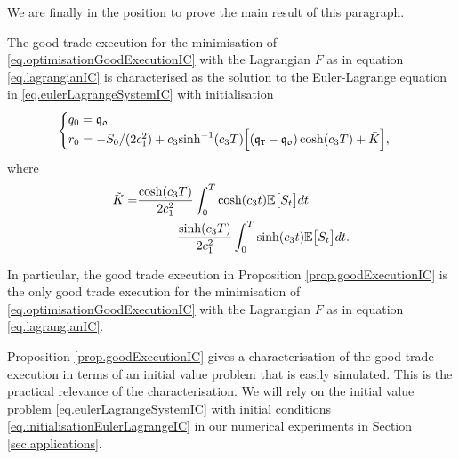 \documentclass[10pt,a4paper]{article}
\begin{document}
We are finally in the position to prove the main result of this  paragraph. 
\begin{prop} \label{prop.eulerLagrangeCharacterisationIC}
The good trade execution for the minimisation of \eqref{eq.optimisationGoodExecutionIC} with the Lagrangian $F$ as in equation \eqref{eq.lagrangianIC} is characterised as the solution to the Euler-Lagrange equation in \eqref{eq.eulerLagrangeSystemIC} with initialisation
\begin{equation}\label{eq.initialisationEulerLagrangeIC}
\begin{cases}
q_0 = \mathfrak{q_0} \\
r_0 = - S_0 / (2c_{1}^{2}) + {c_{3}}{\sinh^{-1} (c_{3} T)}
			\Big[
				(\mathfrak{q}_{\mathtt{T} } - \mathfrak{q_0}) \cosh(c_{3}T) 
				+\tilde{K}
				\Big],
\end{cases}
\end{equation}
where 
\begin{equation*}
\begin{split}
\tilde{K}=&\frac{\cosh(c_{3}T)}{2c_{1}^{2}}
\int_{0}^{T} \cosh(c_{3} t) \mathbb{{E}} \big[S_t \big] dt \\
&\qquad -\frac{\sinh(c_{3}T)}{2c_{1}^{2}}
\int_{0}^{T} \sinh(c_{3} t) \mathbb{{E}} \big[S_t \big] dt.
\end{split}
\end{equation*}	

In particular, the good trade execution in Proposition \ref{prop.goodExecutionIC} is the only good trade execution for the minimisation of \eqref{eq.optimisationGoodExecutionIC} with the Lagrangian $F$ as in equation \eqref{eq.lagrangianIC}.
\end{prop}
\begin{remark}
Proposition \ref{prop.goodExecutionIC} gives a characterisation of the good trade execution in terms of an initial value problem that is easily simulated. This is the practical relevance of the characterisation. We will rely on the initial value problem \eqref{eq.eulerLagrangeSystemIC} with initial conditions \eqref{eq.initialisationEulerLagrangeIC} in our numerical experiments in Section \ref{sec.applications}.
\end{remark}
\end{document}
